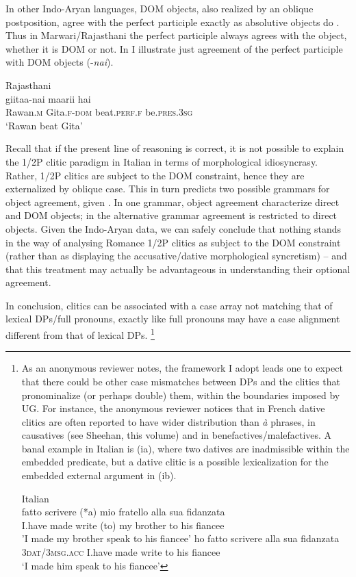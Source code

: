 \documentclass[output=paper,colorlinks,citecolor=brown]{./langscibook}
\begin{document}
In other Indo-Aryan languages, DOM objects, also realized by an oblique postposition, agree with the perfect participle exactly as absolutive objects do \emph{\textup{\citep[342]{Masica1991}}}. Thus in Marwari/Rajasthani the perfect participle always agrees with the object, whether it is DOM or not. In  I illustrate just agreement of the perfect participle with DOM objects (-\textit{nai}).

\ea%
    \label{ex:manzini:19}
    Rajasthani \citep{Khokhlova2002}\\
       {giitaa-nai}  {maarii}    {hai}\\
        Rawan\textsc{.m}   Gita.\textsc{f-dom}   beat.\textsc{perf.f}    be.\textsc{pres.3sg}\\
    \glt ‘Rawan beat Gita’
\z

Recall that if the present line of reasoning is correct, it is not possible to explain the 1/2P clitic paradigm in Italian in terms of morphological idiosyncrasy. Rather, 1/2P clitics are subject to the DOM constraint, hence they are externalized by oblique case. This in turn predicts two possible grammars for object agreement, given . In one grammar, object agreement characterize direct and DOM objects; in the alternative grammar agreement is restricted to direct objects. Given the Indo-Aryan data, we can safely conclude that nothing stands in the way of analysing Romance 1/2P clitics as subject to the DOM constraint (rather than as displaying the accusative/dative morphological syncretism) – and that this treatment may actually be advantageous in understanding their optional agreement. 

In conclusion, clitics can be associated with a case array not matching that of lexical DPs/full pronouns, exactly like full pronouns may have a case alignment different from that of lexical DPs.{} \footnote{As an anonymous reviewer notes, the framework I adopt leads one to expect that there could be other case mismatches between DPs and the clitics that pronominalize (or perhaps double) them, within the boundaries imposed by UG. For instance, the anonymous reviewer notices that in French dative clitics are often reported to have wider distribution than \textit{à} phrases, in causatives (see Sheehan, this volume) and in benefactives/malefactives. A banal example in Italian is (ia), where two datives are inadmissible within the embedded predicate, but a dative clitic is a possible lexicalization for the embedded external argument in (ib). 

\ea%
    \label{ex:manzini:}
    Italian\\
    \ea {} {fatto} {scrivere} (*a) {mio} {fratello} {alla} {sua} {fidanzata}\\
        {I.have} made write (to) my brother to his fiancee\\
    \glt 'I made my brother speak to his fiancee'
    \ex {}     {ho} {fatto} {scrivere}   {alla} {sua} {fidanzata}\\
        {3\textsc{dat}/\textsc{3msg.acc}} {I.have} made write   to his fiancee\\
    \glt ‘I made him speak to his fiancee’
    \z
\z
}
\end{document}
